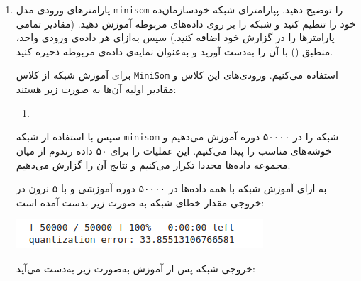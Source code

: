 \begin{enumerate}
\begin{qsolve}
	 	
	\end{qsolve}
	 	
	 	
	 	
	 	
	 	\item پارامتر‌های ورودی مدل \texttt{minisom} را توضیح دهید. پپارامترای شبکه خودسازمان‌ده خود را تنظیم کنید و شبکه را بر روی داده‌های مربوطه آموزش دهید. (مقادیر تمامی پارامتر‌ها را در گزارش خود اضافه کنید.) سپس به‌ازای هر داده‌ی ورودی واحد، منطبق () با آن را به‌دست آورید و به‌عنوان نمایه‌ی داده‌ی مربوطه ذخیره کنید.
	 	
	 	
	 \begin{qsolve}
	 	برای آموزش شبکه از کلاس \texttt{MiniSom} استفاده می‌کنیم. ورودی‌های این کلاس و مقادیر اولیه آن‌ها به صورت زیر هستند:
	 	
	 	\begin{latin}
	 		\begin{enumerate}
	 			\item 
	 		\end{enumerate}
	 	\end{latin}
	 	
	 	
	 \end{qsolve}
	 	
	 	
	 	
	 	
	 	
	 	
	 	
	 	
	 	
	 \begin{qsolve}
	 	
	 	سپس با استفاده از شبکه \texttt{minisom} شبکه را در ۵۰۰۰۰ دوره آموزش می‌دهیم و خوشه‌های مناسب را پیدا می‌کنیم. این عملیات را برای ۵۰ داده رندوم از میان مجموعه داده‌ها مجددا تکرار می‌کنیم و نتایج آن را گزارش می‌دهیم.
	 	
	 	
	 	به ازای آموزش شبکه با همه داده‌ها در ۵۰۰۰۰ دوره آموزشی و با ۵ نرون در خروجی مقدار خطای شبکه به صورت زیر بدست آمده است:
	 	
	 	\begin{center}
	 		\includegraphics*[width=0.7\linewidth]{pics/img17.png}
	 		\label{خطای شبکه}
	 	\end{center}
	 	
	 	خروجی شبکه پس از آموزش به‌صورت زیر به‌دست می‌آید:
	 
	
	\end{qsolve}
	

\end{enumerate}
